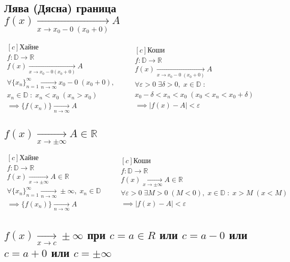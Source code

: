 \documentclass[12pt]{article}
\newcommand{\pto}[2]{\xrightarrow[#1 \to #2]{}}
\newcommand{\xto}[1]{\pto{x}{#1}}
\newcommand{\nto}{\pto{n}{\infty}}
\newcommand{\R}{\mathbb{R}}
\newcommand{\D}{\mathbb{D}}
\newcommand{\spc}{\quad}
\newcommand{\e}{\varepsilon}
\newcommand{\seq}[1]{\{#1_n\}_{n=1}^{\infty}}
\begin{document}
\subsection*{Лява (Дясна) граница \\ \(f(x) \xto{x_0 - 0 \; (x_0 + 0)} A\)}
\(\begin{aligned}[c]
    \text{Хайне}\\
    f: \D \to \R\\
    f(x) \xto{x_0 - 0 (x_0 + 0)} A\\
    \forall \seq{x} \nto x_0 - 0 \; (x_0 + 0),\\
    x_n \in \D \; : \; x_n < x_0 \; (x_n > x_0)\\
    \implies \{f(x_n)\} \nto A 
\end{aligned}
\spc\spc
\begin{aligned}[c]
    \text{Коши}\\
    f: \D \to \R\\
    f(x) \xto{x_0 - 0 \; (x_0 + 0)} A\\
    \forall \e > 0 \; \exists \delta > 0, \; x \in \D \; : \\
    x_0 - \delta < x_n < x_0 \; (x_0 < x_n < x_0 + \delta)\\
    \implies |f(x) - A| < \e
\end{aligned}\)

\subsection*{\(f(x) \xto{\pm \infty} A \in \R\)}
\(\begin{aligned}[c]
    \text{Хайне}\\
    f: \D \to \R\\
    f(x) \xto{\pm \infty} A \in \R\\
    \forall \seq{x} \nto \pm \infty, \; x_n \in \D\\
    \implies \{f(x_n)\} \nto A 
\end{aligned}
\spc\spc
\begin{aligned}[c]
    \text{Коши}\\
    f: \D \to \R\\
    f(x) \xto{\pm \infty} A \in \R\\
    \forall \e > 0 \; \exists M > 0 \; (M < 0), \; x \in \D \; : \; x > M \; (x < M)\\
    \implies |f(x) - A| < \e
\end{aligned}\)

\subsection*{\(f(x) \xto{c} \pm \infty\) при \(c = a \in R\) или \(c = a - 0\) или \(c = a + 0\) или \(c = \pm \infty\)}
\end{document}
